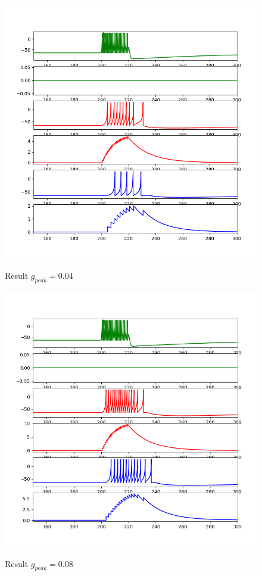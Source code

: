 \documentclass[12pt]{article}
\begin{document}
 \begin{figure}[H]
  \centering
  \includegraphics[width=.8\textwidth]{h3_p1_p1_004.png} %
  \label{img} %
  \caption{Result $g_{peak}=0.04$}
\end{figure}
  \begin{figure}[H]
  \centering
  \includegraphics[width=.8\textwidth]{h3_p1_p1_008.png} %
  \label{img} %
  \caption{Result $g_{peak}=0.08$}
\end{figure}
\end{document}
